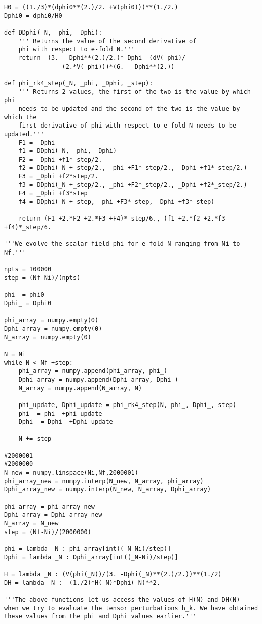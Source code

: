 \documentclass[12pt,a4paper,oneside]{book}
\begin{document}
\begin{appendices}
\begin{small}
\begin{verbatim}
H0 = ((1./3)*(dphi0**(2.)/2. +V(phi0)))**(1./2.)
Dphi0 = dphi0/H0

def DDphi(_N, _phi, _Dphi):
    ''' Returns the value of the second derivative of 
    phi with respect to e-fold N.'''
    return -(3. -_Dphi**(2.)/2.)*_Dphi -(dV(_phi)/
    			(2.*V(_phi)))*(6. -_Dphi**(2.))

def phi_rk4_step(_N, _phi, _Dphi, _step):
    ''' Returns 2 values, the first of the two is the value by which phi 
    needs to be updated and the second of the two is the value by which the 
    first derivative of phi with respect to e-fold N needs to be updated.'''
    F1 = _Dphi
    f1 = DDphi(_N, _phi, _Dphi)
    F2 = _Dphi +f1*_step/2.
    f2 = DDphi(_N +_step/2., _phi +F1*_step/2., _Dphi +f1*_step/2.)
    F3 = _Dphi +f2*step/2.
    f3 = DDphi(_N +_step/2., _phi +F2*_step/2., _Dphi +f2*_step/2.)
    F4 = _Dphi +f3*step
    f4 = DDphi(_N +_step, _phi +F3*_step, _Dphi +f3*_step)  

    return (F1 +2.*F2 +2.*F3 +F4)*_step/6., (f1 +2.*f2 +2.*f3 +f4)*_step/6.

'''We evolve the scalar field phi for e-fold N ranging from Ni to Nf.'''

npts = 100000
step = (Nf-Ni)/(npts)

phi_ = phi0
Dphi_ = Dphi0

phi_array = numpy.empty(0)
Dphi_array = numpy.empty(0)
N_array = numpy.empty(0)

N = Ni
while N < Nf +step:
    phi_array = numpy.append(phi_array, phi_)
    Dphi_array = numpy.append(Dphi_array, Dphi_)
    N_array = numpy.append(N_array, N)
    
    phi_update, Dphi_update = phi_rk4_step(N, phi_, Dphi_, step)
    phi_ = phi_ +phi_update
    Dphi_ = Dphi_ +Dphi_update
    
    N += step

#2000001
#2000000
N_new = numpy.linspace(Ni,Nf,2000001)
phi_array_new = numpy.interp(N_new, N_array, phi_array)
Dphi_array_new = numpy.interp(N_new, N_array, Dphi_array)

phi_array = phi_array_new
Dphi_array = Dphi_array_new
N_array = N_new
step = (Nf-Ni)/(2000000)

phi = lambda _N : phi_array[int((_N-Ni)/step)]
Dphi = lambda _N : Dphi_array[int((_N-Ni)/step)]

H = lambda _N : (V(phi(_N))/(3. -Dphi(_N)**(2.)/2.))**(1./2)
DH = lambda _N : -(1./2)*H(_N)*Dphi(_N)**2.

'''The above functions let us access the values of H(N) and DH(N) 
when we try to evaluate the tensor perturbations h_k. We have obtained 
these values from the phi and Dphi values earlier.'''


\end{verbatim}
\end{small}
\end{appendices}
\end{document}
